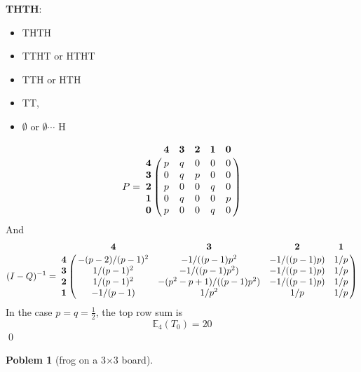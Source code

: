 \documentclass[8pt,notitlepage,twocolumn]{report}
\newtheorem{problem}{Poblem}
\newenvironment{solution}[1][Solution]{\begin{trivlist}
    \item[\hskip \labelsep {\bfseries #1}]}{\end{trivlist}}
\begin{document}
\begin{solution}
{\bf THTH}:
\begin{itemize}
	\item[\quad state 0:] {THTH}
 	\item[state 1:] {TTHT or HTHT}
	\item[state 2:] {TTH or HTH}
	\item[state 3:] {TT,}
	\item[state 4:] {$\emptyset$ or $\emptyset\cdots$ H}
\end{itemize}
\begin{equation}
P = 
\bordermatrix{
		&\mathbf{4} 	& \mathbf{3} 	& \mathbf{2} 	& \mathbf{1} 	& \mathbf{0} 	\cr
\mathbf{4} 	& 	p 	& 	q 	& 	0 	& 	0 	& 0 		\cr
\mathbf{3} & 0 & q & p & 0 & 0		\cr
\mathbf{2} & p & 0 & 0 & q & 0		\cr
\mathbf{1} & 0 & q & 0 & 0 & p		\cr
\mathbf{0} & p & 0 & 0 & q & 0
}
\end{equation}
And
\tiny
\begin{equation}
(I-Q)^{-1} = 
\bordermatrix{
&\mathbf{4} 	& \mathbf{3} 	& \mathbf{2} 	& \mathbf{1} 	\cr
\mathbf{4} & -(p-2)/(p-1)^2 & -1/((p-1) p^2 & -1/((p-1)p) & 1/p 	\cr
\mathbf{3} & 1/(p-1)^2 	& -1/((p-1)p^2) & -1/((p-1)p) & 1/p		\cr
\mathbf{2} & 1/(p-1)^2	& -(p^2-p+1)/((p-1)p^2) & -1/((p-1)p) & 1/p	\cr
\mathbf{1} & -1/(p-1)	& 1/p^2		& 1/p	&1/p			
}
\end{equation}
\normalsize
In the case $p=q=\frac{1}{2}$, the top row sum is
$$
	\mathbb{E}_4(T_0) = 20
$$
\qed
\end{solution}

\begin{problem}[frog on a 3$\times$3 board]
\end{problem}
\end{document}
